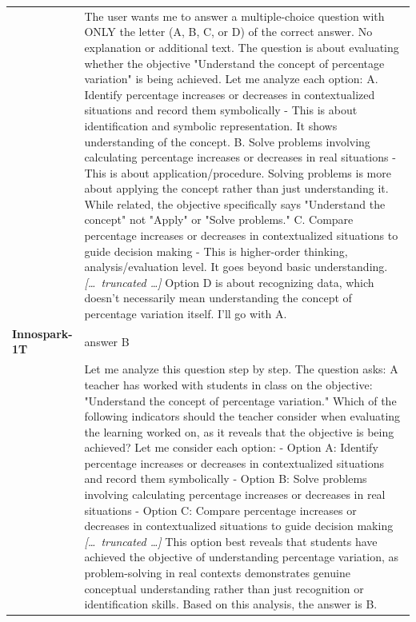 \begin{longtable}{@{}l p{12.5cm}@{}}
  & The user wants me to answer a multiple-choice question with ONLY the letter (A, B, C, or D) of the correct answer. No explanation or additional text. \newline The question is about evaluating whether the objective "Understand the concept of percentage variation" is being achieved. \newline Let me analyze each option: \newline A. Identify percentage increases or decreases in contextualized situations and record them symbolically - This is about identification and symbolic representation. It shows understanding of the concept. \newline B. Solve problems involving calculating percentage increases or decreases in real situations - This is about application/procedure. Solving problems is more about applying the concept rather than just understanding it. While related, the objective specifically says "Understand the concept" not "Apply" or "Solve problems." \newline C. Compare percentage increases or decreases in contextualized situations to guide decision making - This is higher-order thinking, analysis/evaluation level. It goes beyond basic understanding. \newline \textit{[\ldots\ truncated \ldots]} \newline Option D is about recognizing data, which doesn't necessarily mean understanding the concept of percentage variation itself. \newline I'll go with A. \\
  \textbf{Innospark-1T} & answer B \\
  & Let me analyze this question step by step. \newline The question asks: A teacher has worked with students in class on the objective: "Understand the concept of percentage variation." Which of the following indicators should the teacher consider when evaluating the learning worked on, as it reveals that the objective is being achieved? \newline Let me consider each option: \newline - Option A: Identify percentage increases or decreases in contextualized situations and record them symbolically \newline - Option B: Solve problems involving calculating percentage increases or decreases in real situations \newline - Option C: Compare percentage increases or decreases in contextualized situations to guide decision making \newline \textit{[\ldots\ truncated \ldots]} \newline This option best reveals that students have achieved the objective of understanding percentage variation, as problem-solving in real contexts demonstrates genuine conceptual understanding rather than just recognition or identification skills. \newline Based on this analysis, the answer is B. \\

\end{longtable}
